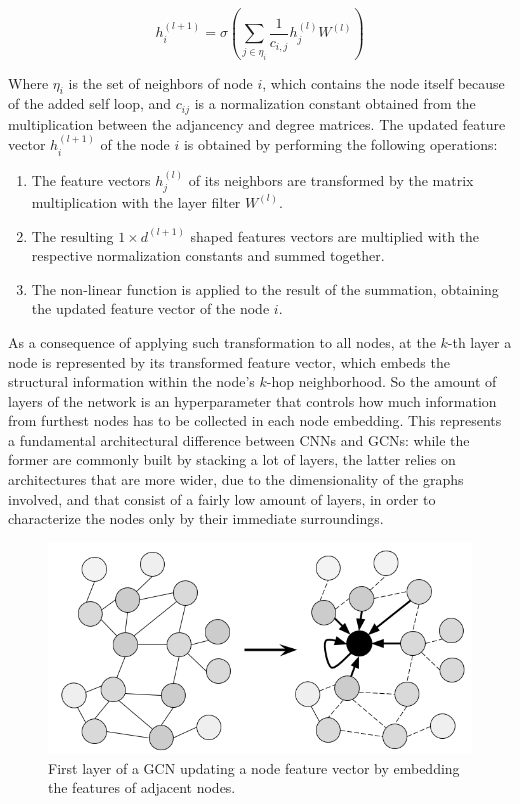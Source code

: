 \documentclass[%
    corpo=13.5pt,
    twoside,
    oldstyle,
    tipotesi=magistrale,
    greek,
    evenboxes
]{toptesi}
\begin{document}
\begin{equation} \label{gcn2}
    h^{(l+1)}_{i}=\sigma(\sum_{j\in\eta_{i}} \frac{1}{c_{i,j}}h_j^{(l)}W^{{(l)}})
\end{equation}

Where $\eta_i$ is the set of neighbors of node $i$, which contains the node
itself because of the added self loop, and $c_{ij}$ is a
normalization constant obtained from the multiplication between the adjancency
and degree matrices.
The updated feature vector $h^{(l+1)}_{i}$ of the node $i$ is
obtained by performing the following operations:

\begin{enumerate}
    \item The feature vectors $h_j^{(l)}$ of its neighbors are transformed by
        the matrix multiplication with the layer filter $W^{(l)}$.
    \item The resulting $1 \times d^{(l+1)}$ shaped features vectors
        are multiplied with the respective normalization constants and summed
        together.
    \item The non-linear function is applied to the result of the summation,
        obtaining the updated feature vector of the node $i$.
\end{enumerate}

As a consequence of applying such transformation to all nodes, at the
$k$-th layer a node is represented by its transformed feature vector, which
embeds the structural information within the node's $k$-hop neighborhood.
So the amount of layers of the network is an hyperparameter that controls how much
information from furthest nodes has to be collected in each node embedding.
This represents a fundamental architectural difference between CNNs and GCNs:
while the former are commonly built by stacking a lot of layers, the latter
relies on architectures that are more wider, due to the dimensionality of the
graphs involved, and that consist of a fairly low amount of layers, in order to
characterize the nodes only by their immediate surroundings.


\begin{figure}[h]
    \centering
    \includegraphics[scale=0.4]{img/gcn.png}
    \caption{First layer of a GCN updating a node feature vector by embedding
        the features of adjacent nodes.}
    \label{fig:gcn}
\end{figure}
\end{document}
